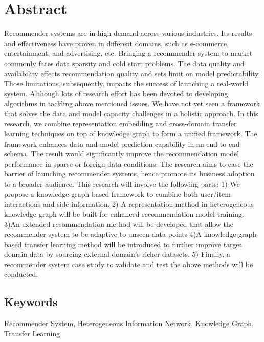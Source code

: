 \section*{Abstract}
Recommender systems are in high demand across various industries. Its results and effectiveness have proven in different domains, such as e-commerce, entertainment, and advertising, etc.
Bringing a recommender system to market commonly faces data sparsity and cold start problems. The data quality and availability effects recommendation quality and sets limit on model predictability. Those limitations, subsequently, impacts the success of launching a real-world system. 
Although lots of research effort has been devoted to developing algorithms in tackling above mentioned issues. We have not yet seen a framework that solves the data and model capacity challenges in a holistic approach.
In this research, we combine representation embedding and cross-domain transfer learning techniques on top of knowledge graph to form a unified framework. The framework enhances data and model prediction capability in an end-to-end schema. The result would significantly improve the recommendation model performance in sparse or foreign data conditions. 
The research aims to ease the barrier of launching recommender systems, hence promote its business adoption to a broader audience. 
This research will involve the following parts: 1) We propose a knowledge graph based framework to combine both user/item interactions and side information. 2) A representation method in heterogeneous knowledge graph will be built for enhanced recommendation model training. 3)An extended recommendation method will be developed that allow the recommender system to be adaptive to unseen data points 4)A knowledge graph based transfer learning method will be introduced to further improve target domain data by sourcing external domain's richer datasets. 5) Finally, a recommender system case study to validate and test the above methods will be conducted.

\subsection*{Keywords} 
Recommender System, Heterogeneous Information Network, Knowledge Graph, Transfer Learning. 